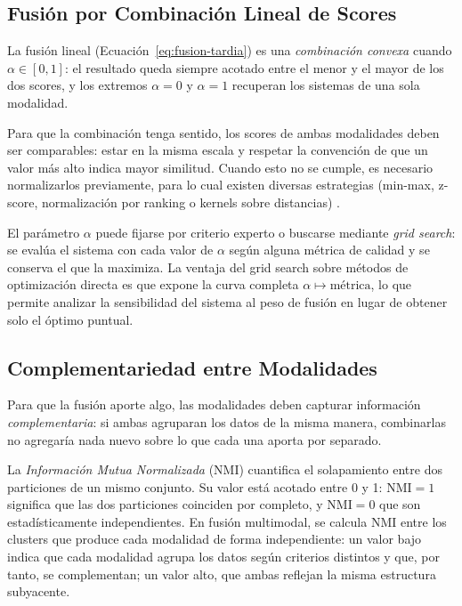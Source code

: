 \subsection{Fusión por Combinación Lineal de Scores}
\label{subsec:fusion-lineal}

La fusión lineal (Ecuación~\ref{eq:fusion-tardia}) es una \textit{combinación convexa} cuando $\alpha \in [0, 1]$: el resultado queda siempre acotado entre el menor y el mayor de los dos scores, y los extremos $\alpha = 0$ y $\alpha = 1$ recuperan los sistemas de una sola modalidad.

Para que la combinación tenga sentido, los scores de ambas modalidades deben ser comparables: estar en la misma escala y respetar la convención de que un valor más alto indica mayor similitud. Cuando esto no se cumple, es necesario normalizarlos previamente, para lo cual existen diversas estrategias (min-max, z-score, normalización por ranking o kernels sobre distancias) \parencite{vogt_1999_linear_fusion, montague_2001_normalization}.

El parámetro $\alpha$ puede fijarse por criterio experto o buscarse mediante \textit{grid search}: se evalúa el sistema con cada valor de $\alpha$ según alguna métrica de calidad y se conserva el que la maximiza. La ventaja del grid search sobre métodos de optimización directa es que expone la curva completa $\alpha \mapsto \text{métrica}$, lo que permite analizar la sensibilidad del sistema al peso de fusión en lugar de obtener solo el óptimo puntual.

\subsection{Complementariedad entre Modalidades}
\label{subsec:complementariedad}

Para que la fusión aporte algo, las modalidades deben capturar información \textit{complementaria}: si ambas agruparan los datos de la misma manera, combinarlas no agregaría nada nuevo sobre lo que cada una aporta por separado.

La \textit{Información Mutua Normalizada} (NMI) cuantifica el solapamiento entre dos particiones de un mismo conjunto. Su valor está acotado entre 0 y 1: $\text{NMI} = 1$ significa que las dos particiones coinciden por completo, y $\text{NMI} = 0$ que son estadísticamente independientes. En fusión multimodal, se calcula NMI entre los clusters que produce cada modalidad de forma independiente: un valor bajo indica que cada modalidad agrupa los datos según criterios distintos y que, por tanto, se complementan; un valor alto, que ambas reflejan la misma estructura subyacente.

